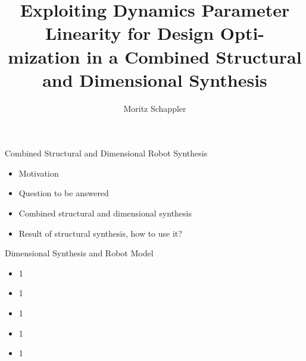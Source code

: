 \documentclass[c]{beamer}
\author[moritz.schappler@imes.uni-hannover.de]{Moritz Schappler}
\title{Exploiting Dynamics Parameter Linearity for Design Opti-\\mization in a Combined Structural and Dimensional Synthesis}
\institute{Institute of Mechatronic Systems}
\newcommand{\postersubsection}[1]{%
\setlength\fboxsep{0pt}%
\vfil\penalty125\vfilneg\vskip1.5ex
\colorbox{Grau}{\parbox[b]{\columnwidth}{\vskip0.75ex%
\Large\hskip1ex #1%
\vskip0.75ex}}%
}
\begin{document}
\begin{frame}
\begin{block}{Combined Structural and Dimensional Robot Synthesis}
\parbox{\linewidth}{
\begin{multicols}{2}
\begin{itemize}
    \item Motivation
    \item Question to be answered
    \item Combined structural and dimensional synthesis
    \item Result of structural synthesis, how to use it?
\end{itemize}

\begin{figure}[t]
    \centering
	
\end{figure}




\end{multicols}}
\end{block}
\begin{whiteblock}{Dimensional Synthesis and Robot Model}
\parbox{\linewidth}{
\begin{multicols}{2}
\begin{itemize}
    \item 1
    \item 1
    \item 1
    \item 1
    \item 1
\end{itemize}
\begin{figure}[t]
    \centering
    
\end{figure}


\end{multicols}}
\end{whiteblock}
\end{frame}
\end{document}
